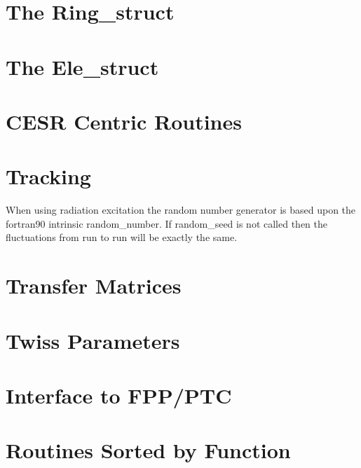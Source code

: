 \documentclass{book}
\begin{document}
\chapter{The Ring\_struct}

\chapter{The Ele\_struct}

\chapter{CESR Centric Routines}

\chapter{Tracking}

When using radiation excitation the random number generator is based
upon the fortran90 intrinsic random_number. If random_seed is not called
then the fluctuations from run to run will be exactly the same.

\chapter{Transfer Matrices}

\chapter{Twiss Parameters}

\chapter{Interface to FPP/PTC}

\chapter{Routines Sorted by Function}
\end{document}
